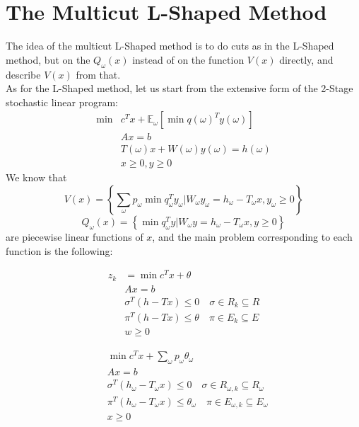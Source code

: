 \documentclass[12pt, openany]{report}
\newcommand{\E}{\mathbb{E}}
\theoremstyle{definition}
\begin{document}
\chapter{The Multicut L-Shaped Method}
The idea of the multicut L-Shaped method is to do cuts as in the L-Shaped method, but on the $Q_\omega(x)$ instead of on the function $V(x)$ directly, and describe $V(x)$ from that. \\
As for the L-Shaped method, let us start from the extensive form of the 2-Stage stochastic linear program:
\begin{equation}
	\begin{aligned}
		\min& c^T x + \E_\omega[\min q(\omega)^Ty(\omega)]\\
		& Ax=b\\
		& T(\omega) x + W(\omega)y(\omega) = h(\omega)\\
		& x\ge0, y\ge 0
	\end{aligned}
\end{equation}
We know that 
\begin{equation}
	V(x) = \left\{\sum_\omega p_\omega \min q_\omega^T y_\omega | W_\omega y_\omega = h_\omega - T_\omega x ,y_\omega \ge 0\right\}
\end{equation}
\begin{equation}\label{eq:ssp}
	Q_\omega(x) = \left\{ \min q_\omega^T y|W_\omega y=h_\omega - T_\omega x, y\ge 0\right\}
\end{equation}
are piecewise linear functions of $x$, and the main problem corresponding to each function is the following:\\
\begin{minipage}{.5\textwidth}
	\begin{equation}
		\begin{aligned}
			z_k &= \min c^T x + \theta \\
			&Ax=b\\
			&\sigma^T(h-Tx)\le 0\quad \sigma\in R_k\subseteq R\\
			&\pi^T(h-Tx)\le \theta \quad \pi\in E_k\subseteq E\\
			& w\ge 0
		\end{aligned}
	\end{equation}
\end{minipage}
\begin{minipage}{.5\textwidth}
	\begin{equation}
		\begin{aligned}
			&\min c^Tx+\sum_\omega p_\omega \theta_\omega \\
			&Ax = b\\
			& \sigma^T(h_\omega-T_\omega x)\le 0\quad \sigma \in R_{\omega,k}\subseteq R_\omega\\
			& \pi^T(h_\omega-T_\omega x)\le \theta_\omega \quad \pi\in E_{\omega, k}\subseteq E_\omega\\
			& x\ge 0
		\end{aligned}
	\end{equation}
\end{minipage}
\end{document}
